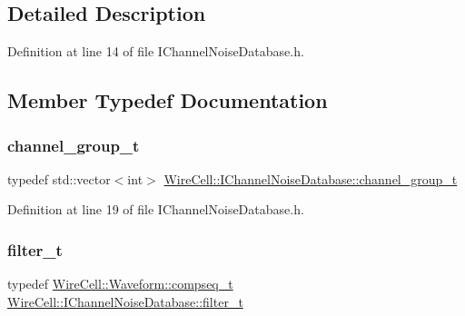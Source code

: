 \subsection{Detailed Description}


Definition at line 14 of file I\+Channel\+Noise\+Database.\+h.



\subsection{Member Typedef Documentation}
\mbox{\label{class_wire_cell_1_1_i_channel_noise_database_a7fedd6ab67ba4e7eeb8cf182cc9dc6b1}} 
\subsubsection{\texorpdfstring{channel\+\_\+group\+\_\+t}{channel\_group\_t}}
{\footnotesize\ttfamily typedef std\+::vector$<$int$>$ \hyperlink{class_wire_cell_1_1_i_channel_noise_database_a7fedd6ab67ba4e7eeb8cf182cc9dc6b1}{Wire\+Cell\+::\+I\+Channel\+Noise\+Database\+::channel\+\_\+group\+\_\+t}}



Definition at line 19 of file I\+Channel\+Noise\+Database.\+h.

\mbox{\label{class_wire_cell_1_1_i_channel_noise_database_a0acbae29743542eb1c652f7a56e692f5}} 
\subsubsection{\texorpdfstring{filter\+\_\+t}{filter\_t}}
{\footnotesize\ttfamily typedef \hyperlink{namespace_wire_cell_1_1_waveform_a7e4a8d371f774438bb360e7d1dcb583a}{Wire\+Cell\+::\+Waveform\+::compseq\+\_\+t} \hyperlink{class_wire_cell_1_1_i_channel_noise_database_a0acbae29743542eb1c652f7a56e692f5}{Wire\+Cell\+::\+I\+Channel\+Noise\+Database\+::filter\+\_\+t}}



